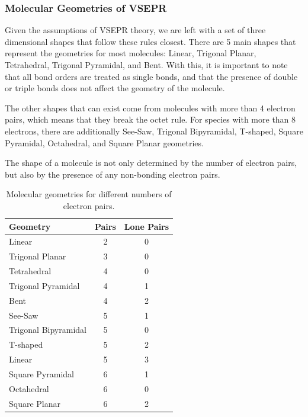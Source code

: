 \subsubsection{Molecular Geometries of VSEPR}
Given the assumptions of VSEPR theory, we are left with a set of three dimensional shapes that follow these rules closest. There are 5 main shapes that represent the geometries for most molecules: Linear, Trigonal Planar, Tetrahedral, Trigonal Pyramidal, and Bent. 
With this, it is important to note that all bond orders are treated as single bonds, and that the presence of double or triple bonds does not affect the geometry of the molecule. 

The other shapes that can exist come from molecules with more than 4 electron pairs, which means that they break the octet rule. For species with more than 8 electrons, there are additionally See-Saw, Trigonal Bipyramidal, T-shaped, Square Pyramidal, Octahedral, and Square Planar geometries. 

The shape of a molecule is not only determined by the number of electron pairs, but also by the presence of any non-bonding electron pairs. 
\begin{table}[h]
    \centering
    \begin{tabular}{|l|c|c|}
        \hline
        Geometry & Pairs & Lone Pairs \\
        \hline
        Linear & 2 & 0 \\
        Trigonal Planar & 3 & 0 \\
        Tetrahedral & 4 & 0 \\
        Trigonal Pyramidal & 4 & 1 \\
        Bent & 4 & 2 \\
        See-Saw & 5 & 1 \\
        Trigonal Bipyramidal & 5 & 0 \\
        T-shaped & 5 & 2 \\
        Linear & 5 & 3 \\
        Square Pyramidal & 6 & 1 \\
        Octahedral & 6 & 0 \\
        Square Planar & 6 & 2 \\
        \hline
    \end{tabular}
    \caption{Molecular geometries for different numbers of electron pairs. }
\end{table}
